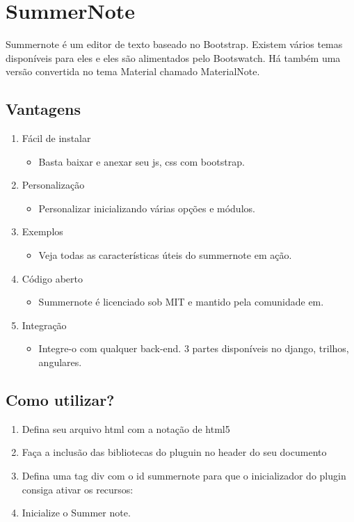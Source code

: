 \documentclass[12pt,a4paper]{article}
\begin{document}
\section{SummerNote}
Summernote é um editor de texto baseado no Bootstrap. Existem vários temas disponíveis para eles e eles são alimentados pelo Bootswatch. Há também uma versão convertida no tema Material chamado MaterialNote.

\subsection{Vantagens}
\begin{enumerate}
\item Fácil de instalar
\begin{itemize}
\item Basta baixar e anexar seu js, css com bootstrap.
\end{itemize}
\item Personalização
\begin{itemize}
\item Personalizar inicializando várias opções e módulos.
\end{itemize}
\item Exemplos
\begin{itemize}
\item Veja todas as características úteis do summernote em ação.
\end{itemize}
\item Código aberto
\begin{itemize}
\item Summernote é licenciado sob MIT e mantido pela comunidade em.
\end{itemize}
\item Integração
\begin{itemize}
\item Integre-o com qualquer back-end. 3 partes disponíveis no django, trilhos, angulares.
\end{itemize}
\end{enumerate}

\subsection{Como utilizar?}
\begin{enumerate}
\item Defina seu arquivo html com a notação de html5

\item Faça a inclusão das bibliotecas do pluguin no header do seu documento

\item Defina uma tag div com o id summernote para que o inicializador do plugin consiga ativar os recursos:

\item Inicialize o Summer note.

\end{enumerate}
\end{document}
